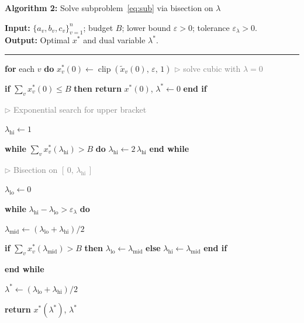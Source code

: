 \documentclass{article}
\newcommand{\clip}{\operatorname{clip}}
\newcommand{\kw}[1]{\textbf{#1}}
\newcommand{\cmt}[1]{\textcolor{gray}{\(\triangleright\) #1}}
\begin{document}
\begin{mdframed}[linewidth=0.8pt, innertopmargin=8pt, innerbottommargin=8pt,
                 innerrightmargin=10pt, innerleftmargin=10pt]
\textbf{Algorithm 2:} Solve subproblem~\eqref{eq:sub} via bisection on
$\lambda$

\medskip
\textbf{Input:} $\{a_v, b_v, c_v\}_{v=1}^n$;\; budget $B$;\;
lower bound $\varepsilon > 0$;\; tolerance $\varepsilon_\lambda > 0$.\\
\textbf{Output:} Optimal $x^*$ and dual variable $\lambda^*$.

\medskip\hrule\medskip

\begin{algolist}
  \item \kw{for} each $v$ \kw{do}\;
    $x_v^*(0) \leftarrow \clip\!\left(\tilde x_v(0),\,\varepsilon,\,1\right)$
    \hfill\cmt{solve cubic with $\lambda=0$}
  \item \kw{if} $\sum_v x_v^*(0) \leq B$ \kw{then return} $x^*(0)$,
    $\lambda^* \leftarrow 0$ \kw{end if}
  \item \cmt{Exponential search for upper bracket}
  \item $\lambda_{\mathrm{hi}} \leftarrow 1$
  \item \kw{while} $\sum_v x_v^*(\lambda_{\mathrm{hi}}) > B$ \kw{do}\;
    $\lambda_{\mathrm{hi}} \leftarrow 2\,\lambda_{\mathrm{hi}}$\;
    \kw{end while}
  \item \cmt{Bisection on $[\,0,\,\lambda_{\mathrm{hi}}\,]$}
  \item $\lambda_{\mathrm{lo}} \leftarrow 0$
  \item \kw{while} $\lambda_{\mathrm{hi}} - \lambda_{\mathrm{lo}} >
    \varepsilon_\lambda$ \kw{do}
  \begin{algoinner}
    \item $\lambda_{\mathrm{mid}} \leftarrow
      (\lambda_{\mathrm{lo}} + \lambda_{\mathrm{hi}})/2$
    \item \kw{if} $\sum_v x_v^*(\lambda_{\mathrm{mid}}) > B$ \kw{then}\;
      $\lambda_{\mathrm{lo}} \leftarrow \lambda_{\mathrm{mid}}$\;
      \kw{else}\; $\lambda_{\mathrm{hi}} \leftarrow \lambda_{\mathrm{mid}}$\;
      \kw{end if}
  \end{algoinner}
  \item \kw{end while}
  \item $\lambda^* \leftarrow (\lambda_{\mathrm{lo}} + \lambda_{\mathrm{hi}})/2$
  \item \textbf{return} $x^*(\lambda^*)$,\; $\lambda^*$
\end{algolist}
\end{mdframed}
\end{document}
